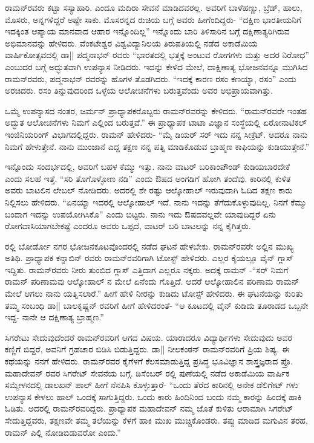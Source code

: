 ರಾಮನ್‍ರವರು ಕಟ್ಟಾ ಸಸ್ಯಾಹಾರಿ. ಎಂದೂ ಮದಿರಾ ಸೇವನೆ ಮಾಡಿದವರಲ್ಲ. ಅವರಿಗೆ ಬಾಳೆಹಣ್ಣು, ಬ್ರೆಡ್, ಹಾಲು, ಮೊಸರು, ಅನ್ನಗಳಿದ್ದರೆ ಅಷ್ಟೇ ಸಾಕು. ಮೊಸರನ್ನದ ರುಚಿಯ ಬಗ್ಗೆ ಅವರು ಹೀಗೆಂದಿದ್ದರು- “ದಕ್ಷಿಣ ಭಾರತೀಯನಿಗೆ ಇದಕ್ಕಿಂತ ಆಪ್ಯಾಯ ಮಾನವಾದ ಆಹಾರ ಇನ್ನೊಂದಿಲ್ಲ” ಇನ್ನೊಂದು ಬಾರಿ ತಿಳಿಸಾರಿನ ಬಗ್ಗೆ ದಕ್ಷಿಣಾತ್ಯರಿಗಿರುವ ಅಭಿಮಾನವನ್ನು ಹೇಳಿದರು. ವೆಂಕಟೇಶ್ವರ ವಿಶ್ವವಿದ್ಯಾನಿಲಯ ತಿರುಪತಿಯಲ್ಲಿ ನಡೆದ ಅಕಾಡೆಮಿಯ ವಾರ್ಷಿಕೋತ್ಸವದಲ್ಲಿ ಡಾ|| ಪದ್ಮನಾಭನ್ ರವರು “ಭಾರತದಲ್ಲಿ ಭತ್ತಕ್ಕೆ ಅಂಟುವ ರೋಗಗಳು ಮತ್ತು ಅದರ ನಿರೋಧ” \textit{} ಎಂಬುದರ ಬಗ್ಗೆ ಅದ್ಭುತವಾಗಿ ಉಪನ್ಯಾಸ ನೀಡಿದರು. ಇದನ್ನು ಕೇಳಿದ ಮೇಲೆ, ದಾಕ್ಷಿಣಾತ್ಯ ಭೋಜನವನ್ನೂ ಮುಗಿಸಿದ ರಾಮನ್‍ರವರು, ಪದ್ಮನಾಭನ್ ರವರನ್ನು ಹೊಗಳ ತೊಡಗಿದರು. “ಇದಕ್ಕೆ ಕಾರಣ ರಸಂ ಕಣಯ್ಯಾ, ರಸಂ” ಎಂದು ಅರಚಿದರು. ರಸಂ ತಿನ್ನುವುದರಿಂದ ಒಳ್ಳೆಯ ಆಲೋಚನೆಗಳು ಬರುತ್ತವೆಂದು ಅವರ ಅಭಿಪ್ರಾಯವಾಗಿತ್ತು.

ಒಮ್ಮೆ ಉಪನ್ಯಾಸದ ನಂತರ, ಜರ್ಮನ್ ಪ್ರಾಧ್ಯಾಪಕರೊಬ್ಬರು ರಾಮನ್‍ರವರನ್ನು ಕೇಳಿದರು. “ರಾಮನ್‍ರವರೇ ಇಂತಹ ಅದ್ಭುತ ಆಲೋಚನೆಗಳು ನಿಮಗೆ ಎಲ್ಲಿಂದ ಬರುತ್ತವೆ.” ಈ ಪ್ರಾಧ್ಯಾಪಕ ಟಾಟಾ ವಿಜ್ಞಾನ ಸಂಸ್ಥೆಯಲ್ಲಿ ಏರೋನಾಟಿಕಲ್ ಇಂಜಿನಿಯರಿಂಗ್ ವಿಭಾಗದಲ್ಲಿದ್ದರು. ರಾಮನ್ ಹೇಳಿದರು- “ಮೈ ಡಿಯರ್ ಸರ್ ಇದು ನನ್ನ ಸೀಕ್ರೆಟ್. ಆದರೂ ನಾನು ನಿಮಗೆ ಹೇಳುತ್ತೇನೆ. ನಾನು ಮುಂಜಾನೆ ಎದ್ದ ತಕ್ಷಣ ನನ್ನ ಪತ್ನಿ ಮಾಡಿಕೊಡುವ ಬ್ರಾಹ್ಮಣ ಕಾಫಿಯನ್ನು ಕುಡಿಯುತ್ತೇನೆ.” 

ಇನ್ನೊಂದು ಸಂದರ್ಭದಲ್ಲಿ, ಅವರಿಗೆ ಬಹಳ ಕೆಮ್ಮು ಇತ್ತು. ನಾನು ವಾಟರ್ ಬರಿಕಾಂಪೌಂಡ್ ಕುಡಿಯಬಾರದೇಕೆ ಎಂದು ಸಲಹೆ ಇತ್ತೆ. “ಸರಿ ತೊಗೊಳ್ಳೋಣ ನಡಿ” ಎಂದು ಔಷದ ಅಂಗಡಿಗೆ ಹೋಗಿ ತಂದೆವು. ಕಾರಿನಲ್ಲಿ ಕುಳಿತ ಅವರು ಬಾಟಲಿನ ಲೇಬಲ್ ನೋಡಿದರು. ಅದರಲ್ಲಿ ಶೇ  ರಷ್ಟು ಆಲ್ಕೋಹಾಲ್ ಇರುವುದಾಗಿ ಓದಿದ ತಕ್ಷಣ ಕಾರು ನಿಲ್ಲಿಸಲು ಹೇಳಿದರು. “ಏನಯ್ಯಾ ಇದರಲ್ಲಿ ಆಲ್ಕೋಹಾಲ್ ಇದೆ. ನಾನು ಇದನ್ನು ತೆಗೆದುಕೊಳ್ಳುವುದಿಲ್ಲ. ನಿನಗೆ ಕೆಮ್ಮು ಬಂದಾಗ ಇದನ್ನು ಉಪಯೋಗಿಸಿಕೊ” ಎಂದು ಬಿಟ್ಟರು. ನಾನು ಇದು ಔಷದವಲ್ಲವೇ ಯಾವುದಿದ್ದರೆ ಏನು ರೋಗವಾಸಿಯಾಗಬೇಕಷ್ಟೆ ಎಂದರೂ ಅವರು ಒಪ್ಪದೆ, ವಾಟರ್ ಬರಿ ಬಾಟಲನ್ನು ನನ್ನ ಕೈಗಿತ್ತರು.

ರಲ್ಲಿ ಬೋರ್ಡೋ ನಗರ ಭೋಜನಕೂಟವೊಂದರಲ್ಲಿ ನಡೆದ ಘಟನೆ ಹೇಳಬೇಕು. ರಾಮನ್‍ರವರೇ ಅಲ್ಲಿನ ಮುಖ್ಯ ಅತಿಥಿ. ಪ್ರಾಧ್ಯಾಪಕ ಕನ್ನಾಬಿನ್ ರವರು ರಾಮನ್‍ರವರಿಗಾಗಿ ಟೋಸ್ಟ್ ಹೇಳಿದರು. ಎಲ್ಲರ ಕೈಯಲ್ಲೂ ವೈನ್ ಗ್ಲಾಸ್ ಇದ್ದಿತು. ರಾಮನ್‍ರವರು ನೀರು ತುಂಬಿದ ಗ್ಲಾಸ್ ಎತ್ತಿದಾಗ ಎಲ್ಲರೂ ನಕ್ಕರು. ಅದಕ್ಕೆ ರಾಮನ್ -“ಸರ್ ನಿಮಗೆ ರಾಮನ್ ಪರಿಣಾಮವು ಆಲ್ಕೋಹಾಲ್ ನ ಮೇಲೆ ಏನೆಂದು ಗೊತ್ತಿದೆ. ಆದರೆ ಆಲ್ಕೋಹಾಲಿನ ಪರಿಣಾಮ ರಾಮನ್ ಮೇಲೆ ಆಗಲು ನಾನು ಯತ್ನಿಸಲಾರೆ.” ಹೀಗೆ ಹೇಳಿ ನೀರನ್ನು ಕುಡಿದು ಟೋಸ್ಟ್ ಹೇಳಿದರು. ಈ ಘಟನೆಯನ್ನು ಕುರಿತು ತಮ್ಮ ಸಂಬಂಧಿ ಡಾ|| ಬಾಲಕೃಷ್ಣನ್ ರವರಿಗೆ ಹೀಗೆ ಹೇಳಿದರಂತೆ- “ಆ ಕೂಟದಲ್ಲಿ ವೈನ್ ಕುಡಿದು ತೂರಾಡದ ಒಬ್ಬನೇ ಇದ್ದ- ನಾನೇ ಆ ದಕ್ಷಿಣಾತ್ಯ ಬ್ರಾಹ್ಮಣ.”

ಸಿಗರೇಟು ಸೇದುವುದೆಂದರೆ ರಾಮನ್‍ರವರಿಗೆ ಆಗದ ವಿಷಯ. ಯಾರಾದರೂ ವಿದ್ಯಾರ್ಥಿಗಳು ಸೇದುವುದು ಅವರ ಕಣ್ಣಿಗೆ ಬಿದ್ದರೆ, ಅವನಿಗೆ ಗ್ರಹಚಾರ ಬಿಡಿಸಿ ಬಿಡುತ್ತಿದ್ದರು. ಡಾ|| ನೀಲಕಂಠನ್ ರಾಮನ್‍ರವರಿಗೆ ಪ್ರಿಯ ಶಿಷ್ಯ. ಈ ಕಥೆಯನ್ನು ನನಗೆ ಹೇಳಿದರು. ರಾಮನ್‍ರವರ ಕೈಗೆಳಗೆ ಕೆಲಸಮಾಡುತ್ತಿದ್ದ ಪ್ರಸಿದ್ಧ ಭೂವಿಜ್ಞಾನ ಶಾಸ್ತ್ರಜ್ಞರಾದ ಪ್ರೊ. ಮಹಾದೇವನ್ ರವರ ಸಿಗರೇಟ್ ಸೇವನೆಯ ಬಗ್ಗೆ. ಡಿಸೆಂಬರ್ ರಲ್ಲಿ ಪುಣೆಯಲ್ಲಿ ನಡೆದ ಅಕಾಡೆಮಿಯ ವಾರ್ಷಿಕ ಸಮ್ಮೇಳನದಲ್ಲಿ ಡಾಲಖನ್ ಪಾಲ್ ಹೀಗೆ ನೆನಪಿಸಿ ಕೊಳ್ಳುತ್ತಾರೆ- “ಒಂದು ತೆರೆದ ಕಾರಿನಲ್ಲಿ ಅನೇಕ ಡೆಲಿಗೇಟ್ ಗಳು ಉಪನ್ಯಾಸ ಕೇಳಲು ಹಾಲ್ ಒಂದಕ್ಕೆ ಸಾಗುತ್ತಿದ್ದರು. ಒಂದು ಕಾರು ಹಿಂದಿನಿಂದ ಬಂದು ನಮ್ಮ ಕಾರನ್ನು ಹಿಂದಕ್ಕೆ ಹಾಕಿ ಓಡಿತು. ಅದರಲ್ಲಿ ರಾಮನ್‍ರವರಿದ್ದರು. ಪ್ರಾಧ್ಯಾಪಕ ಮಹಾದೇವನ್ ನಮ್ಮ ಜೊತೆ ಕುಳಿತು ಆರಾಮಾಗಿ ಸಿಗರೇಟ್ ಸೇದುತ್ತಿದ್ದವರು, ತಕ್ಷಣವೇ ತಮ್ಮ ತಲೆಯನ್ನು ಕೆಳಗೆ ಹಾಕಿ ಮುಖ ಮುಚ್ಚಿಕೊಂಡರು. ತಪ್ಪು ಮಾಡಿದ ಮಗುವಿನ ತರಹ, ರಾಮನ್ ಎಲ್ಲಿ ನೋಡಿಬಿಡುವರೋ ಎಂದು.”

